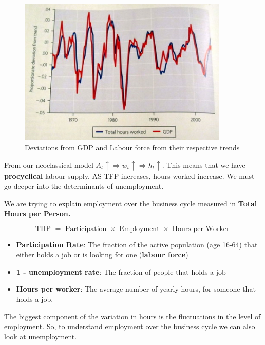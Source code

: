 \documentclass[11pt]{article}
\begin{document}
\begin{figure}[h]
    \centering
    \includegraphics[width=10cm]{photos/labour force vs gdp.png}
    \caption{Deviations from GDP and Labour force from their respective trends}
    \label{fig:labour force vs gdp}
\end{figure}

From our neoclassical model $A_t \uparrow\Rightarrow w_t \uparrow \Rightarrow h_t \uparrow$. This means that we have \textbf{procyclical} labour supply. AS TFP increases, hours worked increase. We must go deeper into the determinants of unemployment.

\begin{definition}
    We are trying to explain employment over the business cycle measured in \textbf{Total Hours per Person.}

\[\text{THP } = \text{ Participation } \times \text{ Employment } \times \text{ Hours per Worker } \]

\begin{itemize}
    \item \textbf{Participation Rate}: The fraction of the active population (age 16-64) that either holds a job or is looking for one (\textbf{labour force})

    \item \textbf{1 - unemployment rate}: The fraction of people that holds a job

    \item \textbf{Hours per worker}: The average number of yearly hours, for someone that holds a job.
\end{itemize}
\end{definition}

The biggest component of the variation in hours is the fluctuations in the level of employment. So, to understand employment over the business cycle we can also look at unemployment.
\end{document}
